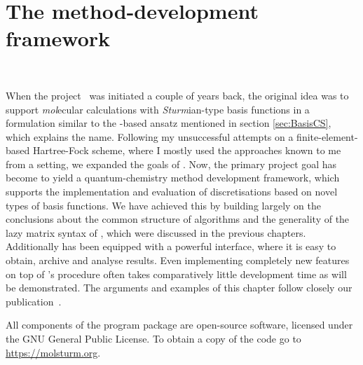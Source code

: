 \chapter{The \molsturm method-development framework}
\label{ch:Molsturm}
 \\


\noindent
When the \molsturm project~\cite{molsturmWeb} was initiated a couple of years back,
the original idea was to support \textit{mol}ecular calculations
with \textit{Sturm}ian-type basis functions
in a formulation similar to the \contraction-based ansatz mentioned in section \ref{sec:BasisCS},
which explains the name.
Following my unsuccessful attempts on a finite-element-based Hartree-Fock scheme,
where I mostly used the approaches known to me from a \cGTO setting,
we expanded the goals of \molsturm.
Now, the primary project goal has become to yield a quantum-chemistry
method development framework,
which supports the implementation and evaluation
of discretisations based on novel types of basis functions.
We have achieved this by building largely on the conclusions
about the common structure of \SCF algorithms
and the generality of the lazy matrix syntax of \lazyten,
which were discussed in the previous chapters.
Additionally \molsturm has been equipped with a powerful \python interface,
where it is easy to obtain, archive and analyse results.
Even implementing completely new features on top of \molsturm's \SCF procedure
often takes comparatively little development time as will be demonstrated.
The arguments and examples of this chapter follow
closely our publication~\cite{molsturmDesign}.

All components of the \molsturm program package
are open-source software, licensed under the GNU General Public License.
To obtain a copy of the code go to \url{https://molsturm.org}.





